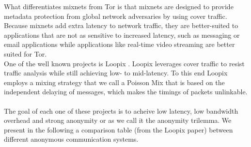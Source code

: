 What differentiates mixnets from Tor is that mixnets are designed to provide metadata protection from global network adversaries by using cover traffic. Because mixnets add extra latency to network traffic, they are better-suited to applications that are not as sensitive to increased latency, such as messaging or email applications while applications like real-time video streaming are better suited for Tor.
\\ One of the well known projects is Loopix \cite{loopix}. Loopix leverages cover traffic to resist traffic analysis while still achieving low- to mid-latency. To this end Loopix employs a mixing strategy that we call a Poisson Mix that is based on the independent delaying of messages, which makes the timings of packets unlinkable.
\\~\\ The goal of each one of these projects is to acheive low latency, low bandwidth overhead and strong anonymity or as we call it the anonymity trilemma. We present in the following a comparison table (from the Loopix paper) between different anonymous communication systems.

